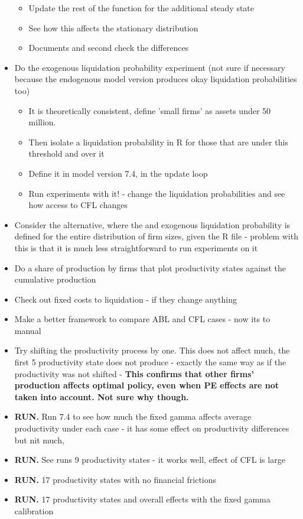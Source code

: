 \documentclass[12pt]{article}
\begin{document}
\begin{itemize}
\begin{itemize}
        \item Update the rest of the function for the additional steady state  \checkmark
        \item See how this affects the stationary distribution \checkmark
        \item Documents and second check the differences  \checkmark
    \end{itemize}
    \item Do the exogenous liquidation probability experiment (not sure if necessary because the endogenous model version produces okay liquidation probabilities too) \checkmark
        \begin{itemize}
            \item It is theoretically consistent, define 'small firms' as assets under 50 million. \checkmark
            \item Then isolate a liquidation probability in R for those that are under this threshold and over it  \checkmark
            \item Define it in model version 7.4, in the update loop \checkmark
            \item Run experiments with it! - change the liquidation probabilities and see how access to CFL changes \checkmark
        \end{itemize}
    \item Consider the alternative, where the and exogenous liquidation probability is defined for the entire distribution of firm sizes, given the R file - problem with this is that it is much less straightforward to run experiments on it \checkmark
    \item Do a share of production by firms that plot productivity states against the cumulative production \checkmark
    \item Check out fixed costs to liquidation - if they change anything \checkmark
    \item Make a better framework to compare ABL and CFL cases - now its to manual  \checkmark
    \item Try shifting the productivity process by one. This does not affect much, the first 5 productivity state does not produce - exactly the same way as if the productivity was not shifted - \textbf{This confirms that other firms' production affects optimal policy, even when PE effects are not taken into account. Not sure why though.} \checkmark
    \item \textbf{RUN.} Run 7.4 to see how much the fixed gamma affects average productivity under each case - it has some effect on productivity differences but nit much, \checkmark
    \item \textbf{RUN.} See runs 9 productivity states - it works well, effect of CFL is large \checkmark
    \item \textbf{RUN.} 17 productivity states with no financial frictions \checkmark
    \item \textbf{RUN.} 17 productivity states and overall effects with the fixed gamma calibration \checkmark
\end{itemize} \normalsize
\newpage
\end{document}
